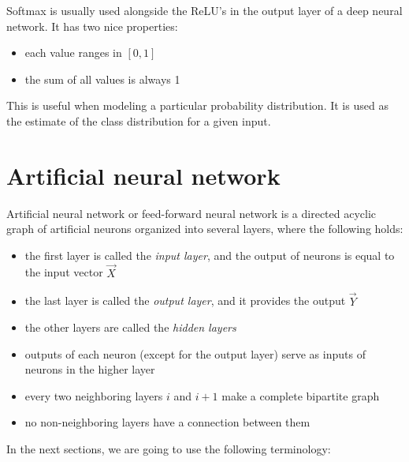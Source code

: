 \noindent
Softmax is usually used alongside the ReLU's in the output layer of a deep neural network. It has two nice properties:

\begin{itemize}

\item each value ranges in $[0, 1]$
\item the sum of all values is always 1

\end{itemize}

This is useful when modeling a particular probability distribution. It is used as the estimate of the class distribution for a given input.

\section{Artificial neural network}

Artificial neural network \cite{nn_book} or feed-forward neural network is a directed acyclic graph of artificial neurons organized into several layers, where the following holds:

\begin{itemize}

\item the first layer is called the \textit{input layer}, and the output of neurons is equal to the input vector $\overrightarrow{X}$

\item the last layer is called the \textit{output layer}, and it provides the output $\overrightarrow{Y}$

\item the other layers are called the \textit{hidden layers}

\item outputs of each neuron (except for the output layer) serve as inputs of neurons in the higher layer

\item every two neighboring layers $i$ and $i+1$ make a complete bipartite graph

\item no non-neighboring layers have a connection between them

\end{itemize}

\noindent
In the next sections, we are going to use the following terminology:

